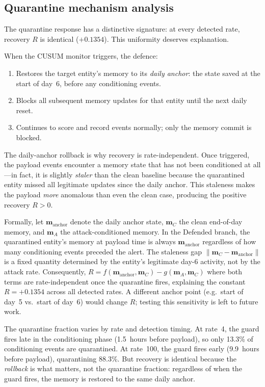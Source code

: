 \documentclass[10pt,twocolumn]{article}
\begin{document}
\subsection{Quarantine mechanism analysis}
\label{sec:quarantine}

The quarantine response has a distinctive signature: at every detected rate,
recovery $R$ is identical ($+0.1354$).  This uniformity deserves explanation.

When the CUSUM monitor triggers, the defence:
\begin{enumerate}
  \item Restores the target entity's memory to its \emph{daily anchor}:
    the state saved at the start of day~6, before any conditioning events.
  \item Blocks all subsequent memory updates for that entity until the
    next daily reset.
  \item Continues to score and record events normally; only the memory
    commit is blocked.
\end{enumerate}

The daily-anchor rollback is why recovery is rate-independent.  Once
triggered, the payload events encounter a memory state that has not been
conditioned at all---in fact, it is slightly \emph{staler} than the
clean baseline because the quarantined entity missed all legitimate
updates since the daily anchor.  This staleness makes the payload
\emph{more} anomalous than even the clean case, producing the positive
recovery $R > 0$.

Formally, let $\mathbf{m}_{\mathrm{anchor}}$ denote the daily anchor
state, $\mathbf{m}_C$ the clean end-of-day memory, and
$\mathbf{m}_A$ the attack-conditioned memory.  In the Defended branch,
the quarantined entity's memory at payload time is always
$\mathbf{m}_{\mathrm{anchor}}$ regardless of how many conditioning
events preceded the alert.  The staleness gap
$\|\mathbf{m}_C - \mathbf{m}_{\mathrm{anchor}}\|$ is a fixed quantity
determined by the entity's legitimate day-6 activity, not by the attack
rate.  Consequently, $R = f(\mathbf{m}_{\mathrm{anchor}},
\mathbf{m}_C) - g(\mathbf{m}_A, \mathbf{m}_C)$ where both terms are
rate-independent once the quarantine fires, explaining the constant
$R = +0.1354$ across all detected rates.  A different anchor point
(e.g.\ start of day~5 vs.\ start of day~6) would change $R$; testing
this sensitivity is left to future work.

The quarantine fraction varies by rate and detection timing.  At rate~4,
the guard fires late in the conditioning phase (1.5~hours before payload),
so only 13.3\% of conditioning events are quarantined.  At rate~100, the
guard fires early (9.9~hours before payload), quarantining 88.3\%.  But
recovery is identical because the \emph{rollback} is what matters, not
the quarantine fraction: regardless of when the guard fires, the memory
is restored to the same daily anchor.
\end{document}
